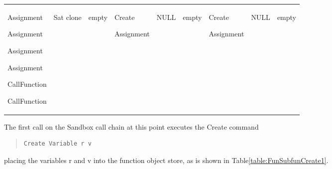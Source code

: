 \begin{center}
\begin{supertabular}{|p{0.75in}|p{0.45in}|p{0.45in}|p{0.69in}|p{0.45in}|p{0.45in}|p{0.69in}|
p{0.44in}|p{0.44in}|}
\begin{small}
Assignment

Assignment

Assignment

Assignment

CallFunction

CallFunction
\end{small} &
\begin{small}
Sat clone
\end{small} &
\begin{small}
empty
\end{small} &
\begin{small}
Create

Assignment
\end{small} &
\begin{small}
NULL
\end{small} &
\begin{small}
empty
\end{small} &
\begin{small}
Create

Assignment
\end{small} &
\begin{small}
NULL
\end{small} &
\begin{small}
empty
\end{small} \\
\end{supertabular}
\end{center}

The first call on the Sandbox call chain at this point executes the Create command

\begin{quote}
\begin{verbatim}
Create Variable r v
\end{verbatim}
\end{quote}

placing the variables r and v into the function object store, as is shown in
Table\ref{table:FunSubfunCreate1}.

